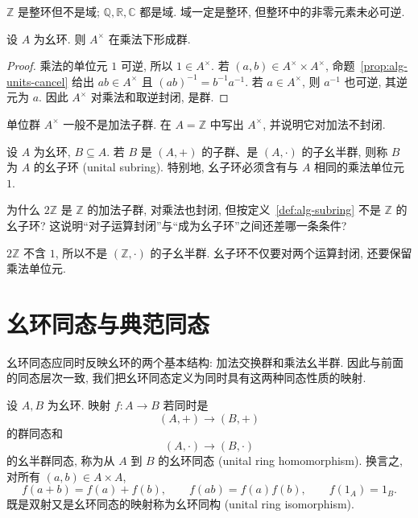 \documentclass[usesamecnt, thmcnt=section, lang=cn, newtx, 10pt, scheme=chinese]{elegantbook}
\begin{document}
\begin{instance}
$\mathbb Z$ 是整环但不是域; $\mathbb Q,\mathbb R,\mathbb C$ 都是域. 域一定是整环, 但整环中的非零元素未必可逆.
\end{instance}

\begin{proposition}\label{prop:alg-unit-group}
设 $A$ 为幺环. 则 $A^\times$ 在乘法下形成群.
\end{proposition}

\begin{proof}
乘法的单位元 $1$ 可逆, 所以 $1\in A^\times$. 若 $(a,b)\in A^\times\times A^\times$, 命题~\ref{prop:alg-units-cancel} 给出 $ab\in A^\times$ 且 $(ab)^{-1}=b^{-1}a^{-1}$. 若 $a\in A^\times$, 则 $a^{-1}$ 也可逆, 其逆元为 $a$. 因此 $A^\times$ 对乘法和取逆封闭, 是群.
\end{proof}

\begin{exercise}\label{ex:alg-units-not-additive}
单位群 $A^\times$ 一般不是加法子群. 在 $A=\mathbb Z$ 中写出 $A^\times$, 并说明它对加法不封闭.
\end{exercise}

\begin{definition}[幺子环]\label{def:alg-subring}
设 $A$ 为幺环, $B\subseteq A$. 若 $B$ 是 $(A,+)$ 的子群、是 $(A,\cdot)$ 的子幺半群, 则称 $B$ 为 $A$ 的{\color{blue}幺子环 (unital subring)}. 特别地, 幺子环必须含有与 $A$ 相同的乘法单位元 $1$.
\end{definition}

\begin{concept}\label{con:alg-subring-01}
为什么 $2\mathbb Z$ 是 $\mathbb Z$ 的加法子群, 对乘法也封闭, 但按定义~\ref{def:alg-subring} 不是 $\mathbb Z$ 的幺子环? 这说明``对子运算封闭''与``成为幺子环''之间还差哪一条条件?
\end{concept}

\begin{solution}
$2\mathbb Z$ 不含 $1$, 所以不是 $(\mathbb Z,\cdot)$ 的子幺半群. 幺子环不仅要对两个运算封闭, 还要保留乘法单位元.
\end{solution}

\section{幺环同态与典范同态}

幺环同态应同时反映幺环的两个基本结构: 加法交换群和乘法幺半群. 因此与前面的同态层次一致, 我们把幺环同态定义为同时具有这两种同态性质的映射.

\begin{definition}[幺环同态与幺环同构]\label{def:alg-ring-hom}
设 $A,B$ 为幺环. 映射 $f:A\to B$ 若同时是
\[
 (A,+)\longrightarrow(B,+)
\]
的群同态和
\[
 (A,\cdot)\longrightarrow(B,\cdot)
\]
的幺半群同态, 称为从 $A$ 到 $B$ 的{\color{blue}幺环同态 (unital ring homomorphism)}. 换言之, 对所有 $(a,b)\in A\times A$,
\[
 f(a+b)=f(a)+f(b),
 \qquad
 f(ab)=f(a)f(b),
 \qquad
 f(1_A)=1_B.
\]
既是双射又是幺环同态的映射称为{\color{blue}幺环同构 (unital ring isomorphism)}.
\end{definition}
\end{document}
